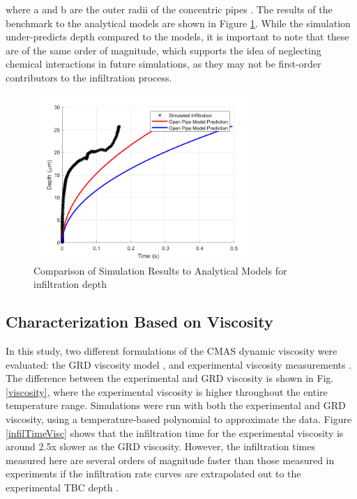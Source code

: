 \documentclass[conf]{new-aiaa}
\begin{document}
\noindent where a and b are the outer radii of the concentric pipes \cite{Naraparaju2019}. The results of the benchmark to the analytical models are shown in Figure \ref{fig:analytBench}. While the simulation under-predicts depth compared to the models, it is important to note that these are of the same order of magnitude, which supports the idea of neglecting chemical interactions in future simulations, as they may not be first-order contributors to the infiltration process.

\begin{figure}[h!]
    \centering
    \includegraphics[width=0.75\textwidth]{Figures/analyticalBenchmark.png}
    \caption{Comparison of Simulation Results to Analytical Models for infiltration depth}
    \label{fig:analytBench}
\end{figure}


\subsection{Characterization Based on Viscosity}
In this study, two different formulations of the CMAS dynamic viscosity were evaluated: the GRD viscosity model \cite{Giordano2008}, and experimental viscosity measurements \cite{Naraparaju2019}.  The difference between the experimental and GRD viscosity is shown in Fig. \ref{viscosity}, where the experimental viscosity is higher throughout the entire temperature range. Simulations were run with both the experimental and GRD viscosity, using a temperature-based polynomial to approximate the data. Figure \ref{infilTimeVisc} shows that the infiltration time for the experimental viscosity is around 2.5x slower as the GRD viscosity. However, the infiltration times measured here are several orders of magnitude faster than those measured in experiments \cite{Naraparaju2019} if the infiltration rate curves are extrapolated out to the experimental TBC depth \cite{Stein2023}. 
\end{document}
